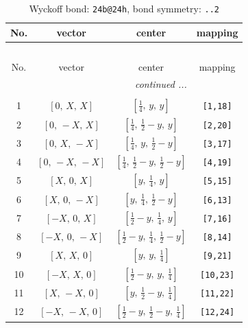 \documentclass[fleqn,8pt]{jsarticle}
\begin{document}
\begin{longtable}{cccc}
\caption{Wyckoff bond: {\tt 24b@24h}, bond symmetry: {\tt ..2}}
 \\
 \hline \hline
No. & vector & center & mapping \\ \hline \endfirsthead

\multicolumn{3}{l}{\tablename\ \thetable{}} \\
 \hline \hline
No. & vector & center & mapping \\ \hline \endhead

 \hline \hline
\multicolumn{3}{r}{\footnotesize\it continued ...} \\ \endfoot

 \hline \hline
\multicolumn{3}{r}{} \\ \endlastfoot

1 & $\left[ 0,\, X,\, X \right]$ & $\left[ \frac{1}{4},\, y,\, y \right]$ & {\tt [1,18]} \\ \hline
2 & $\left[ 0,\, - X,\, X \right]$ & $\left[ \frac{1}{4},\, \frac{1}{2} - y,\, y \right]$ & {\tt [2,20]} \\ \hline
3 & $\left[ 0,\, X,\, - X \right]$ & $\left[ \frac{1}{4},\, y,\, \frac{1}{2} - y \right]$ & {\tt [3,17]} \\ \hline
4 & $\left[ 0,\, - X,\, - X \right]$ & $\left[ \frac{1}{4},\, \frac{1}{2} - y,\, \frac{1}{2} - y \right]$ & {\tt [4,19]} \\ \hline
5 & $\left[ X,\, 0,\, X \right]$ & $\left[ y,\, \frac{1}{4},\, y \right]$ & {\tt [5,15]} \\ \hline
6 & $\left[ X,\, 0,\, - X \right]$ & $\left[ y,\, \frac{1}{4},\, \frac{1}{2} - y \right]$ & {\tt [6,13]} \\ \hline
7 & $\left[ - X,\, 0,\, X \right]$ & $\left[ \frac{1}{2} - y,\, \frac{1}{4},\, y \right]$ & {\tt [7,16]} \\ \hline
8 & $\left[ - X,\, 0,\, - X \right]$ & $\left[ \frac{1}{2} - y,\, \frac{1}{4},\, \frac{1}{2} - y \right]$ & {\tt [8,14]} \\ \hline
9 & $\left[ X,\, X,\, 0 \right]$ & $\left[ y,\, y,\, \frac{1}{4} \right]$ & {\tt [9,21]} \\ \hline
10 & $\left[ - X,\, X,\, 0 \right]$ & $\left[ \frac{1}{2} - y,\, y,\, \frac{1}{4} \right]$ & {\tt [10,23]} \\ \hline
11 & $\left[ X,\, - X,\, 0 \right]$ & $\left[ y,\, \frac{1}{2} - y,\, \frac{1}{4} \right]$ & {\tt [11,22]} \\ \hline
12 & $\left[ - X,\, - X,\, 0 \right]$ & $\left[ \frac{1}{2} - y,\, \frac{1}{2} - y,\, \frac{1}{4} \right]$ & {\tt [12,24]} \\ \hline

\end{longtable}
\end{document}
